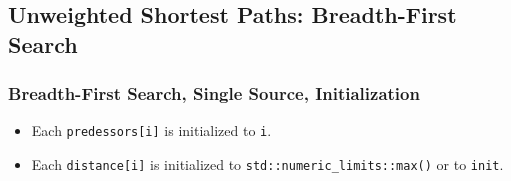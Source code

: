 \begin{comment}
      \subsection{Driver Interface}

      \andrew{I am not sure we should have the unified interface.  We need to be more parsimonious in our interfaces.  Users can read the documentation for which algorithms to use.  And, if they are using graph algorithms, we should assume a certain level of knowledge about graph algorithms.  OTOH, it is only a handful of algorithms.}

      \andrew{I am also not sure we should have ``shortest distance'' variants.  That doubles the number of functions in the interface.
            For each function we have shortest paths, s-t paths, multi-source paths, parallel = 6X variants for each base function.  If we add shortest distances, that will make 12X.  OTOH, we could consider not having s-t paths or not having multi-source paths -- which would leave 4X for each base function.  However, I think people will want s-t and multi-source.
      }
      \phil{\tcode{dijkstra_shortest_distances} includes predecessor and distances, so excluding \tcode{dijkstra_shortest_distances} won't impact 
      the user much.}


      {\small
            
      }

      \andrew{The variety of algorithms was inspired by networkx....  Which also had ``distance'' variants.}

      \phil{I assume \tcode{adjacency_list_graph} is the same as our \tcode{adjacency_list}. \tcode{bidirectional_adjacency_list_graph} is new; what to do with it?}
\end{comment}


\subsection{Unweighted Shortest Paths: Breadth-First Search}

\subsubsection{Breadth-First Search, Single Source, Initialization}

{\small
      
}

\begin{itemdescr}
      \effects
      \begin{itemize}
            \item
                  Each \lstinline{predessors[i]} is initialized to \lstinline{i}.
            \item Each
                  \lstinline{distance[i]} is initialized to \lstinline{std::numeric_limits::max()}
                  or to \lstinline{init}.
      \end{itemize}
\end{itemdescr}


